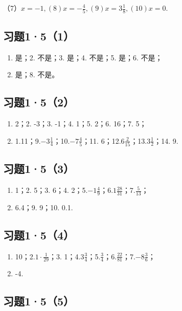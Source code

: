 （7）\(x = -1, (8)x = -\frac{4}{5}, (9)x = 3\frac{1}{8}, (10)x = 0.\)

\subsection{习题1·5（1）}

\begin{enumerate}
\item
  是；2. 不是；3. 是；4. 不是；5. 是；6. 不是；
\item
  是；8. 不是。
\end{enumerate}

\subsection{习题1·5（2）}

\begin{enumerate}
\item
  2；2. -3；3. -1；4. 1；5. 2；6. 16；7. 5；
\item
  1.11；9.\(-3\frac{1}{4}\)；10.\(-7\frac{4}{5}\)；11.
  6；12.\(6\frac{2}{15}\)；13.\(3\frac{1}{2}\)；14. 9.
\end{enumerate}

\subsection{习题1·5（3）}

\begin{enumerate}
\item
  1；2. 5；3. 6；4.
  2；5.\(-1\frac{4}{9}\)；6.\(1\frac{28}{31}\)；7.\(\frac{5}{13}\)；
\item
  6.4；9. 9；10. 0.1.
\end{enumerate}

\subsection{习题1·5（4）}

\begin{enumerate}
\item
  10；2.\(1 \cdot \frac{1}{29}\)；3.
  1；4.\(3 \frac{3}{4}\)；5.\(\frac{3}{4}\)；6.\(\frac{22}{81}\)；7.\(-8 \frac{3}{6}\)；
\item
  -4.
\end{enumerate}

\subsection{习题1·5（5）}

